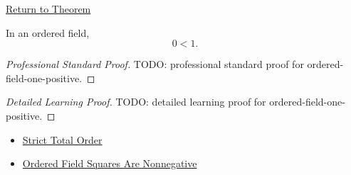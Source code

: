 \newpage
{}
\label{prf:ordered-field-one-positive}

\begin{remark*}[Return]
\hyperref[def:one-in-q]{Return to Theorem}
\end{remark*}

\begin{theorem*}
In an ordered field,
\[
0<1.
\]
\end{theorem*}

\begin{proof}[Professional Standard Proof]
\LRAProofBodyStart
TODO: professional standard proof for ordered-field-one-positive.
\end{proof}

\begin{proof}[Detailed Learning Proof]
\LRAProofBodyStart
TODO: detailed learning proof for ordered-field-one-positive.
\end{proof}

\begin{remark*}
\end{remark*}

\begin{dependencies}
\begin{itemize}
  \item \hyperref[def:strict-total-order]{Strict Total Order}
  \item \hyperref[prop:product-of-positives-is-positive-q]{Ordered Field Squares Are Nonnegative}
\end{itemize}
\end{dependencies}

\clearpage
